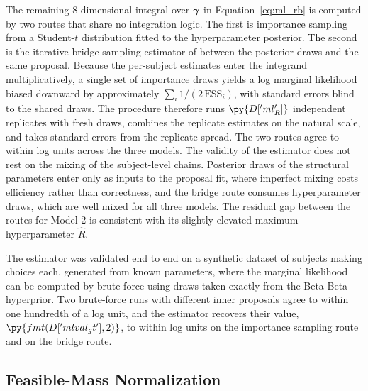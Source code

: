 The remaining 8-dimensional integral over $\boldsymbol{\gamma}$ in
Equation~\eqref{eq:ml_rb} is computed by two routes that share no
integration logic. The first is importance sampling from a Student-$t$
distribution fitted to the hyperparameter posterior. The second is the
iterative bridge sampling estimator of \textcite{MengWong1996} between
the posterior draws and the same proposal. Because the per-subject
estimates enter the integrand multiplicatively, a single set of
importance draws yields a log marginal likelihood biased downward by
approximately $\sum_i 1/(2\,\mathrm{ESS}_i)$, with standard errors blind
to the shared draws. The procedure therefore runs
$\py{D['ml_R']}$ independent replicates with fresh draws, combines the
replicate estimates on the natural scale, and takes standard errors from
the replicate spread. The two routes agree to within
 log units across the three models.
The validity of the estimator does not rest on the mixing of the
subject-level chains. Posterior draws of the structural parameters enter
only as inputs to the proposal fit, where imperfect mixing costs
efficiency rather than correctness, and the bridge route consumes
hyperparameter draws, which are well mixed for all three models. The
residual gap between the routes for Model 2 is consistent with its
slightly elevated maximum hyperparameter $\hat{R}$.

The estimator was validated end to end on a synthetic dataset of
 subjects making 
choices each, generated from known parameters, where the marginal
likelihood can be computed by brute force using draws taken exactly from
the Beta-Beta hyperprior. Two brute-force runs with different inner
proposals agree to within one hundredth of a log unit, and the estimator
recovers their value, $\py{fmt(D['mlval_gt'], 2)}$, to within
 log units on the importance sampling
route and  on the bridge route.

\subsection{Feasible-Mass Normalization}
\label{app:feasible_mass}

